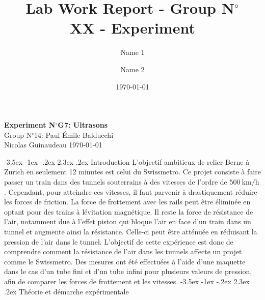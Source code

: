 \documentclass[a4paper, 12pt,oneside]{article}
\makeatletter
\renewcommand{\section}{\@startsection {section}{1}{\z@}%
             {-3.5ex \@plus -1ex \@minus -.2ex}%
             {2.3ex \@plus.2ex}%
             {\normalfont\normalsize\bfseries}}
\makeatother
\begin{document}
\title{\normalsize{Lab Work Report - Group N$^\circ$\\ XX - Experiment}}
\date{\normalsize{\today}}
\author{\normalsize{Name} 1\and \normalsize{Name 2}}


\begin{center}
\large\textbf{\sffamily Experiment N$^\circ$G7: Ultrasons}\\%
\large\sffamily Group N$^\circ$14: Paul-Émile Balducchi\\%
Nicolas Guinaudeau \large\sffamily \today\qquad \\%
\end{center}

\section{Introduction}
L'objectif ambitieux de relier Berne à Zurich en seulement 12 minutes est celui du Swissmetro. Ce projet consiste à faire passer un train dans des tunnels souterrains à des vitesses de l'ordre de $500~\mathrm{km/h}$. Cependant, pour atteindre ces vitesses, il faut parvenir à drastiquement réduire les forces de friction. La force de frottement avec les rails peut être éliminée en optant pour des trains à lévitation magnétique. Il reste la force de résistance de l'air, notamment due à l'effet piston qui bloque l'air en face d'un train dans un tunnel et augmente ainsi la résistance. Celle-ci peut être atténuée en réduisant la pression de l'air dans le tunnel. L'objectif de cette expérience est donc de comprendre comment la résistance de l'air dans les tunnels affecte un projet comme le Swissmetro. Des mesures ont été effectuées à l'aide d'une maquette dans le cas d'un tube fini et d'un tube infini pour plusieurs valeurs de pression, afin de comparer les forces de frottement et les vitesses.
%
\section{Théorie et démarche expérimentale}
\end{document}
